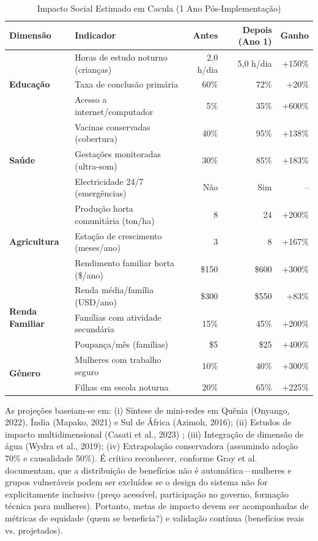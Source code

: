 \documentclass[12pt, a4paper]{article}
\begin{document}
\begin{table}[H]
\centering
\caption{Impacto Social Estimado em Cacula (1 Ano Pós-Implementação)}
\label{Tab:4}
\small
\begin{tabular}{|l|l|r|r|r|}
\hline
\textbf{Dimensão} & \textbf{Indicador} & \textbf{Antes} & \textbf{Depois (Ano 1)} & \textbf{Ganho} \\
\hline
\multirow{3}{*}{\textbf{Educação}} 
  & Horas de estudo noturno (crianças) & 2,0 h/dia & 5,0 h/dia & +150\% \\
  & Taxa de conclusão primária & 60\% & 72\% & +20\% \\
  & Acesso a internet/computador & 5\% & 35\% & +600\% \\
\hline
\multirow{3}{*}{\textbf{Saúde}}
  & Vacinas conservadas (cobertura) & 40\% & 95\% & +138\% \\
  & Gestações monitoradas (ultra-som) & 30\% & 85\% & +183\% \\
  & Electricidade 24/7 (emergências) & Não & Sim & -- \\
\hline
\multirow{3}{*}{\textbf{Agricultura}}
  & Produção horta comunitária (ton/ha) & 8 & 24 & +200\% \\
  & Estação de crescimento (meses/ano) & 3 & 8 & +167\% \\
  & Rendimento familiar horta (\$/ano) & \$150 & \$600 & +300\% \\
\hline
\multirow{3}{*}{\textbf{Renda Familiar}}
  & Renda média/família (USD/ano) & \$300 & \$550 & +83\% \\
  & Famílias com atividade secundária & 15\% & 45\% & +200\% \\
  & Poupança/mês (famílias) & \$5 & \$25 & +400\% \\
\hline
\multirow{2}{*}{\textbf{Género}}
  & Mulheres com trabalho seguro & 10\% & 40\% & +300\% \\
  & Filhas em escola noturna & 20\% & 65\% & +225\% \\
\hline
\end{tabular}
\end{table}

As projeções baseiam-se em: (i) Síntese de mini-redes em Quênia (Onyango, 2022), Índia (Mapako, 2021) e Sul de África (Azimoh, 2016); (ii) Estudos de impacto multidimensional (Casati et al., 2023) ; (iii) Integração de dimensão de água (Wydra et al., 2019); (iv) Extrapolação conservadora (assumindo adoção 70\% e causalidade 50\%).  É crítico reconhecer, conforme Gray et al.~\citep{Gray2019} documentam, que a distribuição de benefícios não é automática—mulheres e grupos vulneráveis podem ser excluídos se o design do sistema não for explicitamente inclusivo (preço acessível, participação no governo, formação técnica para mulheres). Portanto, metas de impacto devem ser acompanhadas de métricas de equidade (quem se beneficia?) e validação contínua (benefícios reais vs. projetados).
\end{document}
